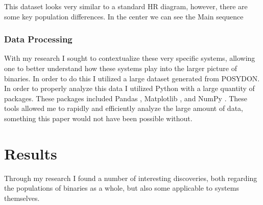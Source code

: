 \documentclass[12pt, a4paper]{article}
\begin{document}
        This dataset looks very similar to a standard HR diagram, however, there are some key population differences. In the center we can see the Main sequence
        \subsubsection{Data Processing}
            With my research I sought to contextualize these very specific systems, allowing one to better understand how these systems play into the larger picture of binaries. In order to do this I utilized a large dataset generated from POSYDON. In order to properly analyze this data I utilized Python with a large quantity of packages. These packages included Pandas \parencite{reback2020pandas}, Matplotlib \parencite{Matplotlib}, and NumPy \parencite{harris2020array}. These tools allowed me to rapidly and efficiently analyze the large amount of data, something this paper would not have been possible without.


    \section{\centering Results}
        Through my research I found a number of interesting discoveries, both regarding the populations of binaries as a whole, but also some applicable to systems themselves.



\end{document}
